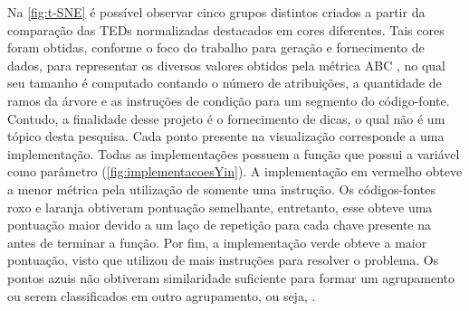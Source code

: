 		Na \cref{fig:t-SNE} é possível observar cinco grupos distintos criados a
		partir da comparação das \acs{TED}s normalizadas destacados em cores diferentes.
		Tais cores foram obtidas, conforme o foco do trabalho para geração e fornecimento
		de dados, para representar os diversos valores obtidos pela métrica ABC
		\cite{fitzpatrick1997applying}, no qual seu tamanho é computado contando o
		número de atribuições, a quantidade de ramos da árvore e as instruções de
		condição para um segmento do código-fonte. Contudo, a finalidade desse projeto é
		o fornecimento de dicas, o qual não é um tópico desta pesquisa. Cada ponto
		presente na visualização corresponde a uma implementação. Todas as
		implementações possuem a função  que possui a
		variável  como parâmetro (\cref{fig:implementacoesYin}). A
		implementação em vermelho obteve a menor métrica pela utilização de somente
		uma instrução. Os códigos-fontes roxo e laranja obtiveram pontuação semelhante,
		entretanto, esse obteve uma pontuação maior devido a um laço de repetição para
		cada chave presente na  antes de terminar a função. Por fim, a
		implementação verde obteve a maior pontuação, visto que utilizou de mais instruções
		para resolver o problema. Os pontos azuis não obtiveram similaridade
		suficiente para formar um agrupamento ou serem classificados em outro agrupamento,
		ou seja, .
		
